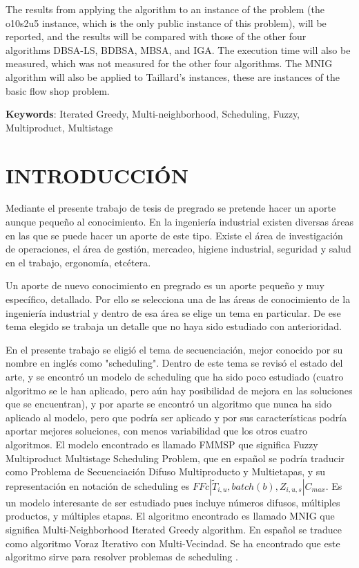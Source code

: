 \documentclass{article}
\def\notac_modelo{$FFc | \tilde{T}_{i, u}, batch(b), Z_{i, u, s} | C_{max}$}
\begin{document}
\vspace{\baselineskip}
The results from applying the algorithm to an instance of the problem (the o10s2u5 instance, which is the only public instance of this problem), will be reported, and the results will be compared with those of the other four algorithms DBSA-LS, BDBSA, MBSA, and IGA. The execution time will also be measured, which was not measured for the other four algorithms. The MNIG algorithm will also be applied to Taillard's instances, these are instances of the basic flow shop problem.

\vspace{\baselineskip}
\par \textbf{Keywords}: Iterated Greedy, Multi-neighborhood, Scheduling, Fuzzy, Multiproduct, Multistage

\section{INTRODUCCIÓN}

Mediante el presente trabajo de tesis de pregrado se pretende hacer un aporte aunque pequeño al conocimiento. En la ingeniería industrial existen diversas áreas en las que se puede hacer un aporte de este tipo. Existe el área de investigación de operaciones, el área de gestión, mercadeo, higiene industrial, seguridad y salud en el trabajo, ergonomía, etcétera. 

\vspace{\baselineskip}
Un aporte de nuevo conocimiento en pregrado es un aporte pequeño y muy específico, detallado. Por ello se selecciona una de las áreas de conocimiento de la ingeniería industrial y dentro de esa área se elige un tema en particular. De ese tema elegido se trabaja un detalle que no haya sido estudiado con anterioridad. 

\pagebreak

\vspace{\baselineskip}
En el presente trabajo se eligió el tema de secuenciación, mejor conocido por su nombre en inglés como "scheduling". Dentro de este tema se revisó el estado del arte, y se encontró un modelo de scheduling que ha sido poco estudiado (cuatro algoritmo se le han aplicado, pero aún hay posibilidad de mejora en las soluciones que se encuentran), y por aparte se encontró un algoritmo que nunca ha sido aplicado al modelo, pero que podría ser aplicado y por sus características podría aportar mejores soluciones, con menos variabilidad que los otros cuatro algoritmos. El modelo encontrado \autocite{modFMMSP} es llamado FMMSP que significa Fuzzy Multiproduct Multistage Scheduling Problem, que en español se podría traducir como Problema de Secuenciación Difuso Multiproducto y Multietapas, y su representación en notación de scheduling es \notac_modelo. Es un modelo interesante de ser estudiado pues incluye números difusos, múltiples productos, y múltiples etapas. El algoritmo encontrado \autocite{algMNIG} es llamado MNIG que significa Multi-Neighborhood Iterated Greedy algorithm. En español se traduce como algoritmo Voraz Iterativo con Multi-Vecindad. Se ha encontrado que este algoritmo sirve para resolver problemas de scheduling \autocite{algMNIG}. 
\end{document}
